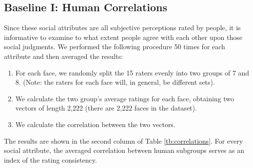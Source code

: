 \documentclass[10pt,twocolumn,letterpaper]{article}
\begin{document}
\subsection{Baseline I: Human Correlations} \label{baseline1}
Since these social attributes are all subjective perceptions rated by people, it is informative to examine to what extent people agree with each other upon those social judgments. We performed the following procedure 50 times for each attribute and then averaged the results:
\begin{enumerate}
\item For each face, we randomly split the 15 raters evenly into two groups of 7 and 8. (Note: the raters for each face will, in general, be different sets).
\item We calculate the two group's average ratings for each face, obtaining two vectors of length 2,222 (there are 2,222 faces in the dataset). 
\item We calculate the correlation between the two vectors. 
\end{enumerate}
The results are shown in the second column of Table \ref{tb:correlations}. For every social attribute, the averaged correlation between human subgroups serves as an index of the rating consistency.

\end{document}
